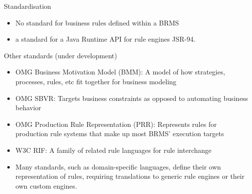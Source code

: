 \begin{frame}
  \begin{block}{Standardisation}
    \begin{itemize}
      \item No standard for business rules defined within a BRMS
      \item a standard for a Java Runtime API for rule engines JSR-94.
    \end{itemize}
  \end{block}

  \begin{block}{Other standards (under development)}
    \begin{itemize}
      \item OMG Business Motivation Model (BMM): A model of how strategies, processes, rules, etc fit together for business modeling
      \item OMG SBVR: Targets business constraints as opposed to automating business behavior
      \item OMG Production Rule Representation (PRR): Represents rules for production rule systems that make up most BRMS' execution targets
      \item W3C RIF: A family of related rule languages for rule interchange
      \item Many standards, such as domain-specific languages, define their own representation of rules, requiring translations to generic rule engines or their own custom engines.
    \end{itemize}
  \end{block}
\end{frame}
